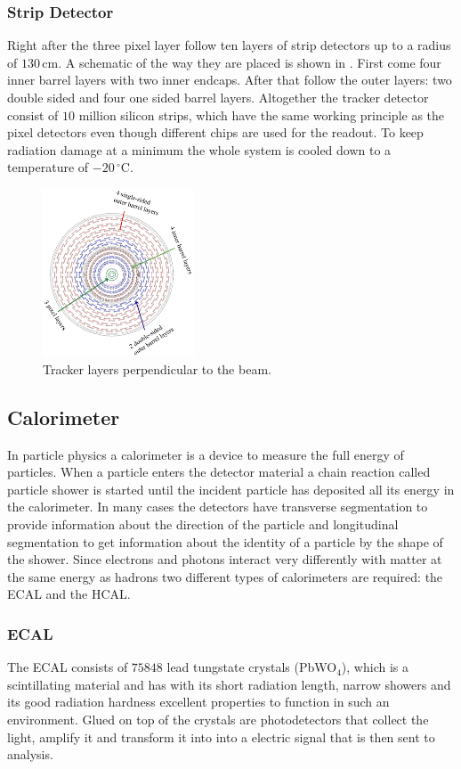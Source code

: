 \documentclass[british,11pt,a4paper]{memoir}
\begin{document}
\subsubsection{Strip Detector}
Right after the three pixel layer follow ten layers of strip detectors up to a radius of $130\,$cm. A schematic of the way they are placed is shown in . First come four inner barrel layers with two inner endcaps. After that follow the outer layers: two double sided and four one sided barrel layers. Altogether the tracker detector consist of $10$ million silicon strips, which have the same working principle as the pixel detectors even though different chips are used for the readout. To keep radiation damage at a minimum the whole system is cooled down to a temperature of $-20\,^{\circ}$C.
\begin{figure}[ht]
	\centering
	\includegraphics[width=0.4\textwidth]{strip}
	\caption{Tracker layers perpendicular to the beam.}
	\label{p23}
\end{figure}
\subsection{Calorimeter}
In particle physics a calorimeter is a device to measure the full energy of particles. When a particle enters the detector material a chain reaction called particle shower is started until the incident particle has deposited all its energy in the calorimeter. In many cases the detectors have transverse segmentation to provide information about the direction of the particle and longitudinal segmentation to get information about the identity of a particle by the shape of the shower. Since electrons and photons interact very differently with matter at the same energy as hadrons two different types of calorimeters are required: the \ac{ECAL} and the \ac{HCAL}.
\subsubsection{\ac{ECAL}}
The \ac{ECAL} consists of $75848$ lead tungstate crystals (PbWO$_{4}$), which is a scintillating material and has with its short radiation length, narrow showers and its good radiation hardness excellent properties to function in such an environment. Glued on top of the crystals are photodetectors that collect the light, amplify it and transform it into into a electric signal that is then sent to analysis.
\end{document}
